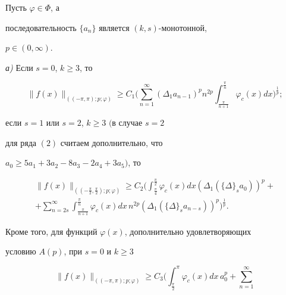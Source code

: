 \begin{assrt}


Пусть $\varphi\in\Phi$, а


последовательность $\{a_n\}$ является $(k,s)$-монотонной,


$p\in (0,\infty)$.





{\em а)} Если $s=0$, $k\geq 3$, то


\begin{equation}


\| f(x)\|_{((-\pi,\pi);p;\varphi)}\geq


C_1\bigg(\sum\limits_{n=1}^{\infty}(\Delta_1a_{n-1})^p n^{2p}


\int_{\frac{\pi}{n+1}}^{\frac{\pi}{n}} \varphi_c(x)dx\bigg)^{\frac{1}{p}};


\end{equation}





если $s=1$ или $s=2$, $k\geq 3$ $($в случае $s=2$ 


для ряда $(2)$ считаем дополнительно, что


$a_0\geq 5a_1+3a_2-8a_3-2a_4+3a_5)$, то


\begin{multline}


\| f(x)\|_{((-\frac{\pi}{2},\frac{\pi}{2});p;\varphi)}\geq


C_2\bigg(\int_{\frac{\pi}{4}}^{\frac{\pi}{2}} \varphi_c(x) dx


(\Delta_1(\{\Delta\}_sa_0))^p+\\ +


\sum\limits_{n=2s}^{\infty}


\int_{\frac{\pi}{n+1}}^{\frac{\pi}{n}} \varphi_c(x) dx\, n^{2p}


(\Delta_1(\{\Delta\}_sa_{n-s}))^p \bigg)^{\frac{1}{p}}.


\end{multline}


Кроме того, для функций $\varphi(x)$, дополнительно удовлетворяющих


условию $A(p)$, при $s=0$ и $k\geq 3$


\begin{equation}


\| f(x)\|_{((-\pi,\pi);p;\varphi)}\geq


C_3\bigg(\int_{\frac{\pi}{2}}^{\pi} \varphi_c(x) dx\,


a_0^p+\sum\limits_{n=1}^{\infty}



\end{equation}
\end{assrt}
